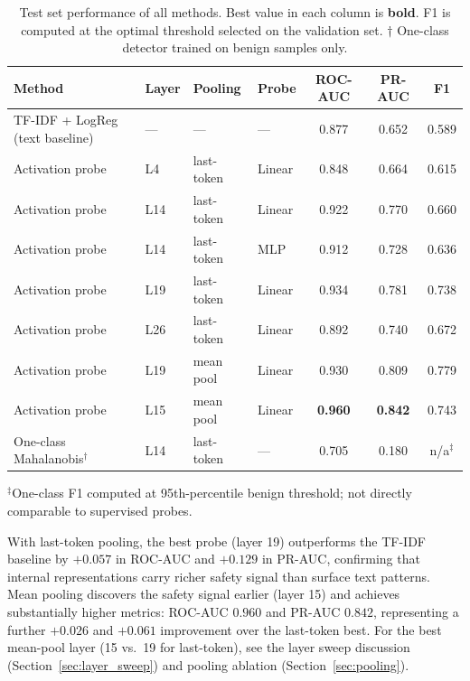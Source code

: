 \documentclass[11pt,a4paper]{article}
\begin{document}
\begin{table}[H]
\centering
\caption{Test set performance of all methods. Best value in each column is \textbf{bold}.
         F1 is computed at the optimal threshold selected on the validation set.
         $\dagger$ One-class detector trained on benign samples only.}
\label{tab:main_results}
\begin{tabular}{llllccc}
\toprule
Method & Layer & Pooling & Probe & ROC-AUC & PR-AUC & F1 \\
\midrule
TF-IDF + LogReg (text baseline) & --- & --- & --- & 0.877 & 0.652 & 0.589 \\
\midrule
Activation probe & L4  & last-token & Linear & 0.848 & 0.664 & 0.615 \\
Activation probe & L14 & last-token & Linear & 0.922 & 0.770 & 0.660 \\
Activation probe & L14 & last-token & MLP    & 0.912 & 0.728 & 0.636 \\
Activation probe & L19 & last-token & Linear & 0.934 & 0.781 & 0.738 \\
Activation probe & L26 & last-token & Linear & 0.892 & 0.740 & 0.672 \\
\midrule
Activation probe & L19 & mean pool  & Linear & 0.930 & 0.809 & 0.779 \\
Activation probe & L15 & mean pool  & Linear & \textbf{0.960} & \textbf{0.842} & 0.743 \\
\midrule
One-class Mahalanobis$^\dagger$ & L14 & last-token & --- & 0.705 & 0.180 & n/a$^{\ddagger}$ \\
\bottomrule
\end{tabular}
\vspace{0.4em}

\footnotesize{$^{\ddagger}$One-class F1 computed at 95th-percentile benign threshold; not directly comparable to supervised probes.}
\end{table}

With last-token pooling, the best probe (layer 19) outperforms the TF-IDF baseline
by $+0.057$ in ROC-AUC and $+0.129$ in PR-AUC, confirming that internal
representations carry richer safety signal than surface text patterns.
Mean pooling discovers the safety signal earlier (layer 15) and achieves
substantially higher metrics: ROC-AUC $0.960$ and PR-AUC $0.842$, representing
a further $+0.026$ and $+0.061$ improvement over the last-token best.
For the best mean-pool layer (15 vs.\ 19 for last-token), see the layer sweep
discussion (Section~\ref{sec:layer_sweep}) and pooling ablation
(Section~\ref{sec:pooling}).
\end{document}
